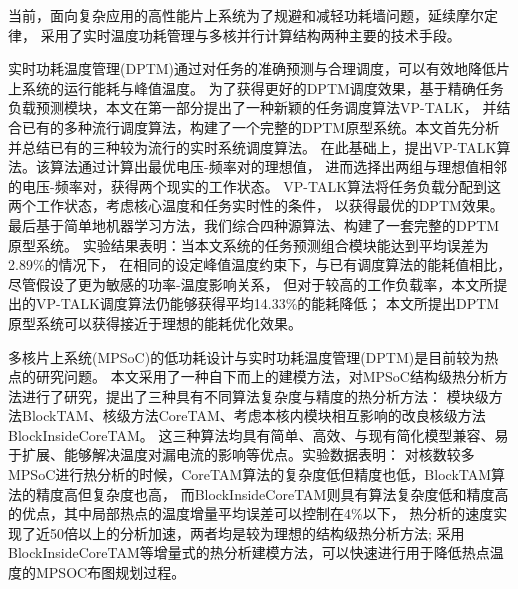 

{}

\makeatother



\begin{cabstract}

当前，面向复杂应用的高性能片上系统为了规避和减轻功耗墙问题，延续摩尔定律， 采用了实时温度功耗管理与多核并行计算结构两种主要的技术手段。


实时功耗温度管理(DPTM)通过对任务的准确预测与合理调度，可以有效地降低片上系统的运行能耗与峰值温度。 为了获得更好的DPTM调度效果，基于精确任务负载预测模块，本文在第一部分提出了一种新颖的任务调度算法VP-TALK， 并结合已有的多种流行调度算法，构建了一个完整的DPTM原型系统。本文首先分析并总结已有的三种较为流行的实时系统调度算法。 在此基础上，提出VP-TALK算法。该算法通过计算出最优电压-频率对的理想值， 进而选择出两组与理想值相邻的电压-频率对，获得两个现实的工作状态。 VP-TALK算法将任务负载分配到这两个工作状态，考虑核心温度和任务实时性的条件， 以获得最优的DPTM效果。最后基于简单地机器学习方法，我们综合四种源算法、构建了一套完整的DPTM原型系统。 实验结果表明：当本文系统的任务预测组合模块能达到平均误差为2.89\%的情况下，
在相同的设定峰值温度约束下，与已有调度算法的能耗值相比，尽管假设了更为敏感的功率-温度影响关系， 但对于较高的工作负载率，本文所提出的VP-TALK调度算法仍能够获得平均14.33\%的能耗降低；
本文所提出DPTM原型系统可以获得接近于理想的能耗优化效果。


多核片上系统(MPSoC)的低功耗设计与实时功耗温度管理(DPTM)是目前较为热点的研究问题。 本文采用了一种自下而上的建模方法，对MPSoC结构级热分析方法进行了研究，提出了三种具有不同算法复杂度与精度的热分析方法： 模块级方法BlockTAM、核级方法CoreTAM、考虑本核内模块相互影响的改良核级方法BlockInsideCoreTAM。 这三种算法均具有简单、高效、与现有简化模型兼容、易于扩展、能够解决温度对漏电流的影响等优点。实验数据表明：
对核数较多MPSoC进行热分析的时候，CoreTAM算法的复杂度低但精度也低，BlockTAM算法的精度高但复杂度也高， 而BlockInsideCoreTAM则具有算法复杂度低和精度高的优点，其中局部热点的温度增量平均误差可以控制在4\%以下， 热分析的速度实现了近50倍以上的分析加速，两者均是较为理想的结构级热分析方法;
采用BlockInsideCoreTAM等增量式的热分析建模方法，可以快速进行用于降低热点温度的MPSOC布图规划过程。


\end{cabstract}

